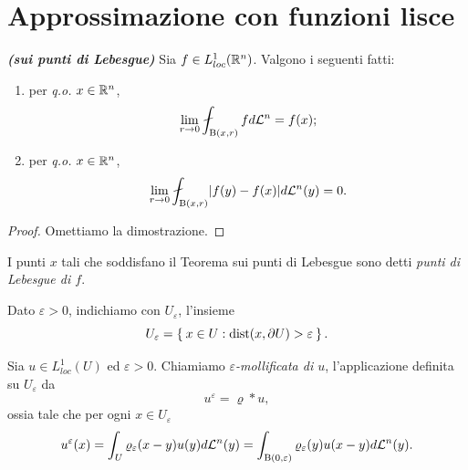 \section{Approssimazione con funzioni lisce}
\begin{teorema}\emph{\textbf{(sui punti di Lebesgue)}}
	Sia $f \in L^1_{loc}(\mathbb{R}^n)$. Valgono i seguenti fatti:
	\begin{enumerate}[$(a)$]
		\item per \emph{q.o.} $x \in \mathbb{R}^n$, 
		\[ \lim\limits_{r \to 0} \fint_{\textup{B}(x,r)} f d\mathcal{L}^n = f(x);\]
		\item per \emph{q.o.} $x \in \mathbb{R}^n$, 
		\[ \lim\limits_{r \to 0} \fint_{\textup{B}(x,r)} \abs{f(y)- f(x)}d\mathcal{L}^n(y)= 0.\]
	\end{enumerate}
\end{teorema}
\begin{proof}
	Omettiamo la dimostrazione.
\end{proof}
\begin{definizione}
	I punti $x$ tali che soddisfano il Teorema sui punti di Lebesgue sono detti \emph{punti di Lebesgue di $f$}.
\end{definizione}
\begin{notazione}
	Dato $\varepsilon>0$, indichiamo con $U_{\varepsilon}$, l'insieme
	\[U_{\varepsilon} = \Set{ x \in U: \textup{dist}(x,\partial U) > \varepsilon}.\]
\end{notazione}
\begin{definizione}
	Sia $u \in L^1_{loc}(U)$ ed $\varepsilon > 0$. Chiamiamo \emph{$\varepsilon$-mollificata di $u$}, l'applicazione definita su $U_\varepsilon$ da
	\[ u^\varepsilon = \varrho \ast u,\]
	ossia tale che per ogni $x \in U_{\varepsilon}$
	\[ u^\varepsilon(x) = \int_{U} \varrho_\varepsilon(x-y)u(y)d\mathcal{L}^n(y) = \int_{\textup{B}(0,\varepsilon)} \varrho_\varepsilon(y) u(x-y)d\mathcal{L}^n(y). \]
\end{definizione}
